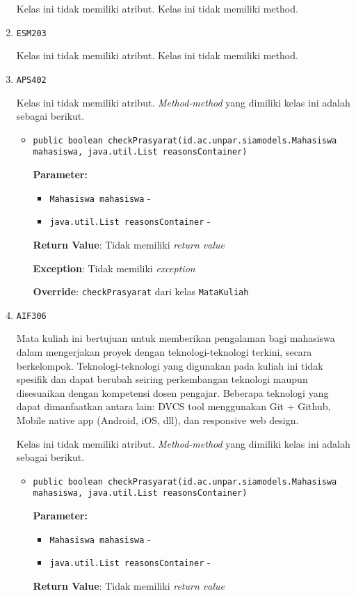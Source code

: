 \documentclass{article}
\begin{document}
\begin{enumerate}
Kelas ini tidak memiliki atribut. Kelas ini tidak memiliki method. \item \texttt{ESM203}



Kelas ini tidak memiliki atribut. Kelas ini tidak memiliki method. \item \texttt{APS402}



Kelas ini tidak memiliki atribut. \textit{Method-method} yang dimiliki kelas ini adalah sebagai berikut.
\begin{itemize}
\item \texttt{public boolean checkPrasyarat(id.ac.unpar.siamodels.Mahasiswa mahasiswa, java.util.List reasonsContainer)}

\textbf{Parameter:}
\begin{itemize}
\item \texttt{Mahasiswa mahasiswa} - 
\item \texttt{java.util.List reasonsContainer} - 
\end{itemize}
\textbf{Return Value}: Tidak memiliki \textit{return value}

\textbf{Exception}: Tidak memiliki \textit{exception}

\textbf{Override}: \texttt{checkPrasyarat} dari kelas \texttt{MataKuliah}

\end{itemize}
\item \texttt{AIF306}

Mata kuliah ini bertujuan untuk memberikan pengalaman bagi mahasiswa dalam
 mengerjakan proyek dengan teknologi-teknologi terkini, secara berkelompok.
 Teknologi-teknologi yang digunakan pada kuliah ini tidak spesifik dan dapat
 berubah seiring perkembangan teknologi maupun disesuaikan dengan kompetensi
 dosen pengajar. Beberapa teknologi yang dapat dimanfaatkan antara lain: DVCS
 tool menggunakan Git + Github, Mobile native app (Android, iOS, dll), dan
 responsive web design.

Kelas ini tidak memiliki atribut. \textit{Method-method} yang dimiliki kelas ini adalah sebagai berikut.
\begin{itemize}
\item \texttt{public boolean checkPrasyarat(id.ac.unpar.siamodels.Mahasiswa mahasiswa, java.util.List reasonsContainer)}

\textbf{Parameter:}
\begin{itemize}
\item \texttt{Mahasiswa mahasiswa} - 
\item \texttt{java.util.List reasonsContainer} - 
\end{itemize}
\textbf{Return Value}: Tidak memiliki \textit{return value}


\end{itemize}
\end{enumerate}
\end{document}
